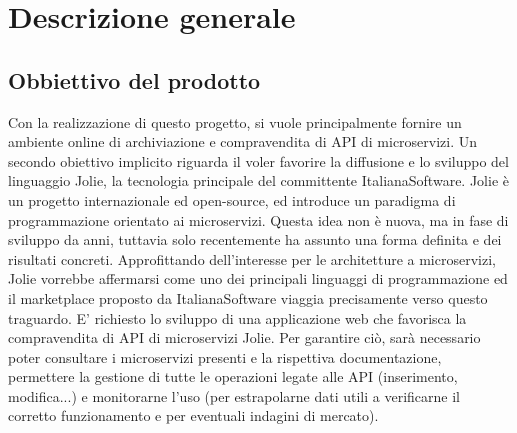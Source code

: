 \newpage
\section{Descrizione generale}
\subsection{Obbiettivo del prodotto}
Con la realizzazione di questo progetto, si vuole principalmente fornire un ambiente online di archiviazione e compravendita di API di microservizi. Un secondo obiettivo implicito riguarda il voler favorire la diffusione e lo sviluppo del linguaggio Jolie, la tecnologia principale del committente ItalianaSoftware. Jolie è un progetto internazionale ed open-source, ed introduce un paradigma di programmazione orientato ai microservizi. Questa idea non è nuova, ma in fase di sviluppo da anni, tuttavia solo recentemente ha assunto una forma definita e dei risultati concreti. Approfittando dell'interesse per le architetture a microservizi, Jolie vorrebbe affermarsi come uno dei principali linguaggi di programmazione ed il marketplace proposto da ItalianaSoftware viaggia precisamente verso questo traguardo. E' richiesto lo sviluppo di una applicazione web che favorisca la compravendita di API di microservizi Jolie. Per garantire ciò, sarà necessario poter consultare i microservizi presenti e la rispettiva documentazione, permettere la gestione di tutte le operazioni legate alle API (inserimento, modifica...) e monitorarne l'uso (per estrapolarne dati utili a verificarne il corretto funzionamento e per eventuali indagini di mercato).

